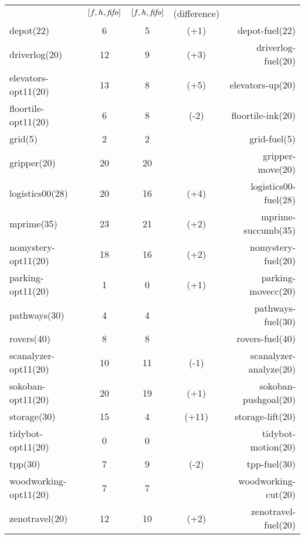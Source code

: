 \begin{center}
\begin{tabular}{|lc|ccr|}
 & \([f,h,{\text{\textit{fifo}}}]\) & \([f,h,{\text{\textit{fifo}}}]\) & (difference) & \\
depot(22) & 6 & 5 & (+1) & depot-fuel(22)\\
driverlog(20) & 12 & 9 & (+3) & driverlog-fuel(20)\\
elevators-opt11(20) & 13 & 8 & (+5) & elevators-up(20)\\
floortile-opt11(20) & 6 & 8 & (-2) & floortile-ink(20)\\
grid(5) & 2 & 2 &  & grid-fuel(5)\\
gripper(20) & 20 & 20 &  & gripper-move(20)\\
logistics00(28) & 20 & 16 & (+4) & logistics00-fuel(28)\\
mprime(35) & 23 & 21 & (+2) & mprime-succumb(35)\\
nomystery-opt11(20) & 18 & 16 & (+2) & nomystery-fuel(20)\\
parking-opt11(20) & 1 & 0 & (+1) & parking-movecc(20)\\
pathways(30) & 4 & 4 &  & pathways-fuel(30)\\
rovers(40) & 8 & 8 &  & rovers-fuel(40)\\
scanalyzer-opt11(20) & 10 & 11 & (-1) & scanalyzer-analyze(20)\\
sokoban-opt11(20) & 20 & 19 & (+1) & sokoban-pushgoal(20)\\
storage(30) & 15 & 4 & (+11) & storage-lift(20)\\
tidybot-opt11(20) & 0 & 0 &  & tidybot-motion(20)\\
tpp(30) & 7 & 9 & (-2) & tpp-fuel(30)\\
woodworking-opt11(20) & 7 & 7 &  & woodworking-cut(20)\\
zenotravel(20) & 12 & 10 & (+2) & zenotravel-fuel(20)\\
\end{tabular}
\end{center}
